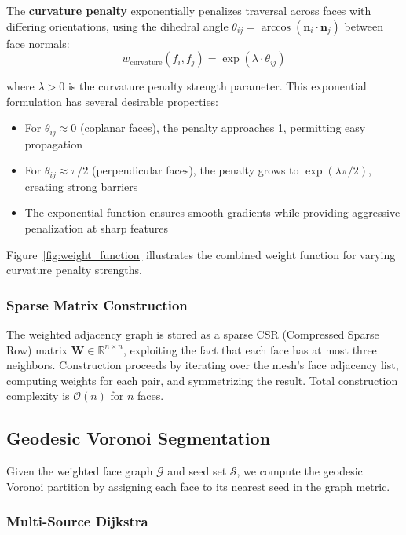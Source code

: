 The \textbf{curvature penalty} exponentially penalizes traversal across faces with differing orientations, using the dihedral angle $\theta_{ij} = \arccos(\mathbf{n}_i \cdot \mathbf{n}_j)$ between face normals:
\begin{equation}
    w_{\text{curvature}}(f_i, f_j) = \exp(\lambda \cdot \theta_{ij})
\end{equation}

where $\lambda > 0$ is the curvature penalty strength parameter. This exponential formulation has several desirable properties:
\begin{itemize}
    \item For $\theta_{ij} \approx 0$ (coplanar faces), the penalty approaches 1, permitting easy propagation
    \item For $\theta_{ij} \approx \pi/2$ (perpendicular faces), the penalty grows to $\exp(\lambda \pi/2)$, creating strong barriers
    \item The exponential function ensures smooth gradients while providing aggressive penalization at sharp features
\end{itemize}

Figure~\ref{fig:weight_function} illustrates the combined weight function for varying curvature penalty strengths.

\subsubsection{Sparse Matrix Construction}

The weighted adjacency graph is stored as a sparse CSR (Compressed Sparse Row) matrix $\mathbf{W} \in \mathbb{R}^{n \times n}$, exploiting the fact that each face has at most three neighbors. Construction proceeds by iterating over the mesh's face adjacency list, computing weights for each pair, and symmetrizing the result. Total construction complexity is $\mathcal{O}(n)$ for $n$ faces.


\subsection{Geodesic Voronoi Segmentation}

Given the weighted face graph $\mathcal{G}$ and seed set $\mathcal{S}$, we compute the geodesic Voronoi partition by assigning each face to its nearest seed in the graph metric.

\subsubsection{Multi-Source Dijkstra}

